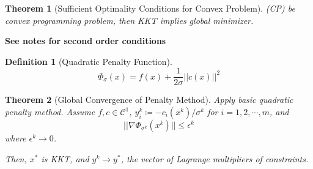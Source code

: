 \documentclass[a4paper]{article}
\newcommand{\C}{\mathcal{C}}
\newcommand{\norm}[1]{\lvert \lvert #1 \rvert \rvert}
\newtheorem{theorem}{Theorem}
\newtheorem*{definition*}{Definition}
\begin{document}
\begin{theorem}[Sufficient Optimality Conditions for Convex Problem]
    (CP) be convex programming problem, then KKT implies global minimizer.
\end{theorem}

\textbf{See notes for second order conditions}

\begin{definition*}[Quadratic Penalty Function]
    \begin{equation*}
        \Phi_\sigma (x) = f(x) + \frac{1}{2\sigma} \norm{c(x)}^2
    \end{equation*}
\end{definition*}

\setcounter{theorem}{20}
\begin{theorem}[Global Convergence of Penalty Method]
    Apply basic quadratic penalty method.
    Assume $f,c \in \C^1$, $y_i^k \coloneqq -c_i \left( x^k \right) / \sigma^k$ for $i = 1, 2, \cdots, m$, and
    \begin{equation*}
        \norm{\nabla \Phi_{\sigma^k} \left( x^k \right)} \leq \epsilon^k
    \end{equation*}
    where $\epsilon^k \rightarrow 0$.

    Then,
    $x^*$ is KKT, and $y^k \rightarrow y^*$, the vector of Lagrange multipliers of constraints.
\end{theorem}
\end{document}
